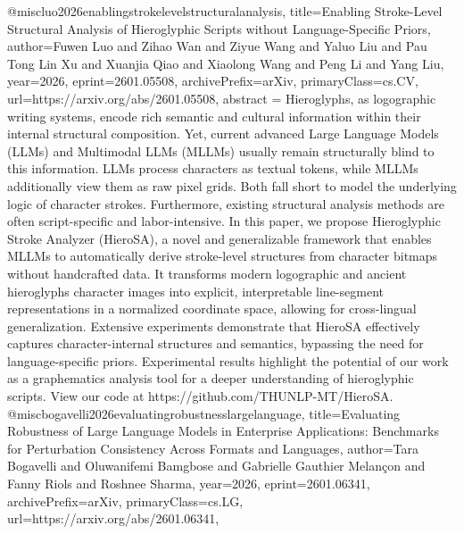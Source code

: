 {}@misc{luo2026enablingstrokelevelstructuralanalysis,
      title={Enabling Stroke-Level Structural Analysis of Hieroglyphic Scripts without Language-Specific Priors}, 
      author={Fuwen Luo and Zihao Wan and Ziyue Wang and Yaluo Liu and Pau Tong Lin Xu and Xuanjia Qiao and Xiaolong Wang and Peng Li and Yang Liu},
      year={2026},
      eprint={2601.05508},
      archivePrefix={arXiv},
      primaryClass={cs.CV},
      url={https://arxiv.org/abs/2601.05508},
      abstract = {Hieroglyphs, as logographic writing systems, encode rich semantic and cultural information within their internal structural composition. Yet, current advanced Large Language Models (LLMs) and Multimodal LLMs (MLLMs) usually remain structurally blind to this information. LLMs process characters as textual tokens, while MLLMs additionally view them as raw pixel grids. Both fall short to model the underlying logic of character strokes. Furthermore, existing structural analysis methods are often script-specific and labor-intensive. In this paper, we propose Hieroglyphic Stroke Analyzer (HieroSA), a novel and generalizable framework that enables MLLMs to automatically derive stroke-level structures from character bitmaps without handcrafted data. It transforms modern logographic and ancient hieroglyphs character images into explicit, interpretable line-segment representations in a normalized coordinate space, allowing for cross-lingual generalization. Extensive experiments demonstrate that HieroSA effectively captures character-internal structures and semantics, bypassing the need for language-specific priors. Experimental results highlight the potential of our work as a graphematics analysis tool for a deeper understanding of hieroglyphic scripts. View our code at https://github.com/THUNLP-MT/HieroSA.}
}@misc{bogavelli2026evaluatingrobustnesslargelanguage,
      title={Evaluating Robustness of Large Language Models in Enterprise Applications: Benchmarks for Perturbation Consistency Across Formats and Languages}, 
      author={Tara Bogavelli and Oluwanifemi Bamgbose and Gabrielle Gauthier Melançon and Fanny Riols and Roshnee Sharma},
      year={2026},
      eprint={2601.06341},
      archivePrefix={arXiv},
      primaryClass={cs.LG},
      url={https://arxiv.org/abs/2601.06341},
}
